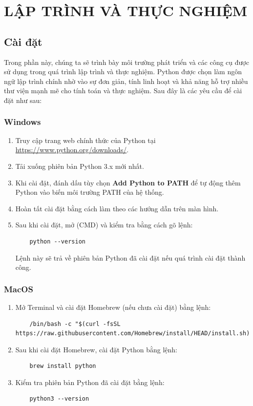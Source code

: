 \chapter{LẬP TRÌNH VÀ THỰC NGHIỆM}

\section{Cài đặt}
Trong phần này, chúng ta sẽ trình bày môi trường phát triển và các công cụ được sử dụng trong quá trình lập trình và thực nghiệm. Python được chọn làm ngôn ngữ lập trình chính nhờ vào sự đơn giản, tính linh hoạt và khả năng hỗ trợ nhiều thư viện mạnh mẽ cho tính toán và thực nghiệm. Sau đây là các yêu cầu để cài đặt như sau:

\subsection{Windows}
\begin{enumerate}
    \item Truy cập trang web chính thức của Python tại \url{https://www.python.org/downloads/}.
    \item Tải xuống phiên bản Python 3.x mới nhất.
    \item Khi cài đặt, đánh dấu tùy chọn \textbf{Add Python to PATH} để tự động thêm Python vào biến môi trường PATH của hệ thống.
    \item Hoàn tất cài đặt bằng cách làm theo các hướng dẫn trên màn hình.
    \item Sau khi cài đặt, mở  (CMD) và kiểm tra bằng cách gõ lệnh:
    \begin{verbatim}
    python --version
    \end{verbatim}
    Lệnh này sẽ trả về phiên bản Python đã cài đặt nếu quá trình cài đặt thành công.
\end{enumerate}

\subsection{MacOS}
\begin{enumerate}
    \item Mở Terminal và cài đặt Homebrew (nếu chưa cài đặt) bằng lệnh:
    \begin{verbatim}
    /bin/bash -c "$(curl -fsSL https://raw.githubusercontent.com/Homebrew/install/HEAD/install.sh)"
    \end{verbatim}
    \item Sau khi cài đặt Homebrew, cài đặt Python bằng lệnh:
    \begin{verbatim}
    brew install python
    \end{verbatim}
    \item Kiểm tra phiên bản Python đã cài đặt bằng lệnh:
    \begin{verbatim}
    python3 --version
    \end{verbatim}
\end{enumerate}

